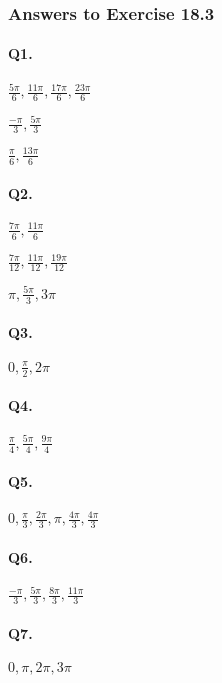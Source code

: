 \documentclass{article}
\begin{document}
\subsubsection {Answers to Exercise 18.3}

\paragraph{Q1.}
\begin{enumerate*}[label=\alph*)]
          \item $\frac{5\pi}{6},\frac{11\pi}{6},\frac{17\pi}{6},\frac{23\pi}{6}$
          \item $\frac{-\pi}{3},\frac{5\pi}{3}$
          \item $\frac{\pi}{6},\frac{13\pi}{6}$
\end{enumerate*}

\paragraph{Q2.}
\begin{enumerate*}[label=\alph*)]
          \item $\frac{7\pi}{6},\frac{11\pi}{6}$
          \item $\frac{7\pi}{12},\frac{11\pi}{12},\frac{19\pi}{12}$
          \item $\pi,\frac{5\pi}{3},3\pi$
\end{enumerate*}

\paragraph{Q3.} $0,\frac{\pi}{2},2\pi$
\paragraph{Q4.} $\frac{\pi}{4},\frac{5\pi}{4},\frac{9\pi}{4}$
\paragraph{Q5.} $0,\frac{\pi}{3},\frac{2\pi}{3},\pi,\frac{4\pi}{3},\frac{4\pi}{3}$
\paragraph{Q6.} $\frac{-\pi}{3},\frac{5\pi}{3},\frac{8\pi}{3},\frac{11\pi}{3}$
\paragraph{Q7.} $0,\pi,2\pi,3\pi$
\end{document}
